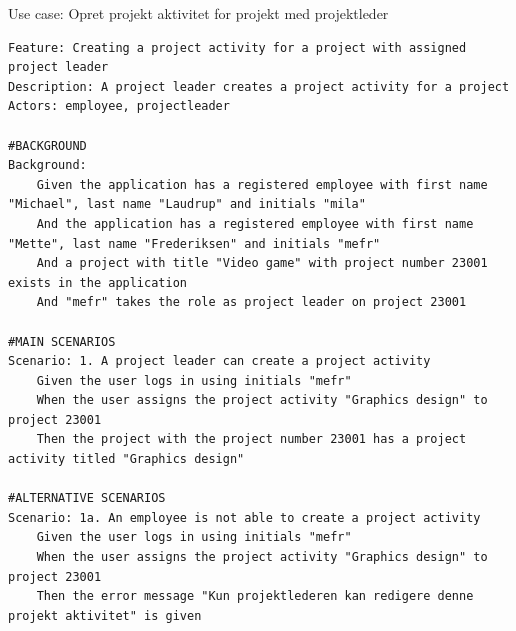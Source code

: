 \begin{listing}[H]
    \centering
    \caption{Use case: Opret projekt aktivitet for projekt med projektleder} \label{lst:usecase_project_activity_with_leader}
    \begin{verbatim}  
Feature: Creating a project activity for a project with assigned project leader
Description: A project leader creates a project activity for a project
Actors: employee, projectleader

#BACKGROUND
Background:
    Given the application has a registered employee with first name "Michael", last name "Laudrup" and initials "mila"
    And the application has a registered employee with first name "Mette", last name "Frederiksen" and initials "mefr"
    And a project with title "Video game" with project number 23001 exists in the application
    And "mefr" takes the role as project leader on project 23001

#MAIN SCENARIOS
Scenario: 1. A project leader can create a project activity
    Given the user logs in using initials "mefr"
    When the user assigns the project activity "Graphics design" to project 23001
    Then the project with the project number 23001 has a project activity titled "Graphics design"

#ALTERNATIVE SCENARIOS
Scenario: 1a. An employee is not able to create a project activity
    Given the user logs in using initials "mefr"
    When the user assigns the project activity "Graphics design" to project 23001
    Then the error message "Kun projektlederen kan redigere denne projekt aktivitet" is given
    \end{verbatim}
\end{listing}
